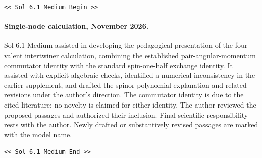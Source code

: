 \documentclass[11pt,a4paper]{article}
\theoremstyle{definition}
\newcommand{\GPTBegin}{\par\noindent\textcolor{GPTMarker}{\texttt{\textless\textless{} Sol 6.1 Medium Begin \textgreater\textgreater}}\par}
\newcommand{\GPTEnd}{\par\noindent\textcolor{GPTMarker}{\texttt{\textless\textless{} Sol 6.1 Medium End \textgreater\textgreater}}\par}
\begin{document}
\GPTBegin{}

\paragraph{Single-node calculation, November 2026.}
Sol 6.1 Medium assisted in developing the pedagogical presentation of the
four-valent intertwiner calculation, combining the established
pair-angular-momentum commutator identity with the standard spin-one-half
exchange identity. It assisted with explicit algebraic checks, identified
a numerical inconsistency in the earlier supplement, and drafted the
spinor-polynomial explanation and related revisions under the author's
direction. The commutator identity is due to the cited literature; no
novelty is claimed for either identity. The author reviewed the proposed
passages and authorized their inclusion. Final scientific responsibility
rests with the author. Newly drafted or substantively revised passages
are marked with the model name.

\GPTEnd{}
\end{document}
